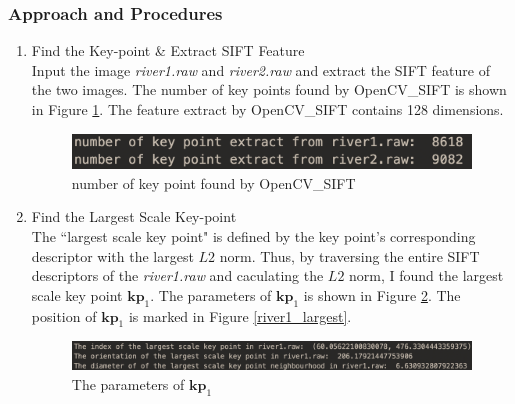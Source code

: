\documentclass[11pt]{article}
\newcommand{\vct}[1]{\bm{#1}}
\begin{document}
\subsubsection{Approach and Procedures}
\begin{enumerate}
\item Find the Key-point \& Extract SIFT Feature \\
Input the image {\it river1.raw} and {\it river2.raw} and extract the SIFT feature of the two images. The number of key points found by OpenCV\_SIFT is shown in Figure \ref{numofkey}. The feature extract by OpenCV\_SIFT contains 128 dimensions. 
\begin{figure}[!htp]
	\centering
	\includegraphics[scale=0.4]{numofkey.png}
	\caption{number of key point found by OpenCV\_SIFT}
	\label{numofkey}
	\end{figure}
\item Find the Largest Scale Key-point\\
The ``largest scale key point" is defined by the key point's corresponding descriptor with the largest $L2$ norm. Thus, by traversing the entire SIFT descriptors of the {\it river1.raw} and caculating the $L2$ norm, I found the largest scale key point $\vct {kp}_1$. The parameters of $\vct {kp}_1$ is shown in Figure \ref{largestscalekp}. The position of $\vct {kp}_1$ is marked in Figure \ref{river1_largest}.
\begin{figure}[!htp]
	\centering
	\includegraphics[scale=0.4]{largestscalekp.png}
	\caption{ The parameters of $\vct {kp}_1$}
	\label{largestscalekp}
	\end{figure}


\end{enumerate}
\end{document}
